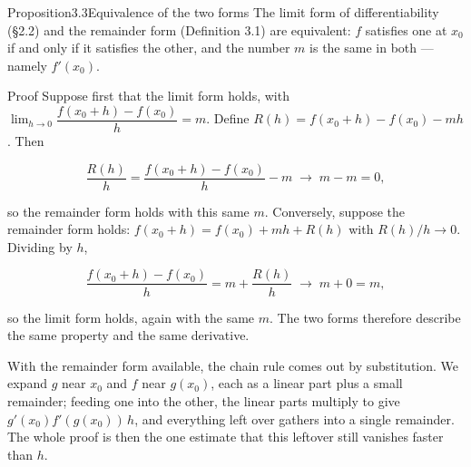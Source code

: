 \begin{hkproposition}{Proposition}{3.3}{Equivalence of the two forms}
The limit form of differentiability (§2.2) and the remainder form (Definition 3.1) are equivalent: \(f\) satisfies one at \(x_{0}\) if and only if it satisfies the other, and the number \(m\) is the same in both — namely \(f'(x_{0})\).
\end{hkproposition}
\begin{hkproof}{Proof}{}{}
Suppose first that the limit form holds, with \(\lim_{h \to 0}\dfrac{f(x_{0}+h) - f(x_{0})}{h} = m\). Define \(R(h) = f(x_{0}+h) - f(x_{0}) - m h\). Then

\[ \frac{R(h)}{h} = \frac{f(x_{0}+h) - f(x_{0})}{h} - m \;\longrightarrow\; m - m = 0, \]

so the remainder form holds with this same \(m\). Conversely, suppose the remainder form holds: \(f(x_{0}+h) = f(x_{0}) + m h + R(h)\) with \(R(h)/h \to 0\). Dividing by \(h\),

\[ \frac{f(x_{0}+h) - f(x_{0})}{h} = m + \frac{R(h)}{h} \;\longrightarrow\; m + 0 = m, \]

so the limit form holds, again with the same \(m\). The two forms therefore describe the same property and the same derivative.
\end{hkproof}
With the remainder form available, the chain rule comes out by substitution. We expand \(g\) near \(x_{0}\) and \(f\) near \(g(x_{0})\), each as a linear part plus a small remainder; feeding one into the other, the linear parts multiply to give \(g'(x_{0})f'(g(x_{0}))\,h\), and everything left over gathers into a single remainder. The whole proof is then the one estimate that this leftover still vanishes faster than \(h\).

